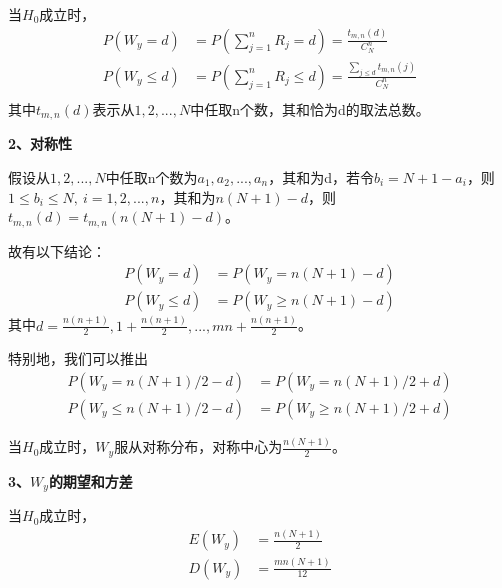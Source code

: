 \documentclass[lang=cn,10pt]{elegantbook}
\begin{document}
\begin{proposition}
    当$H_0$成立时，
    \begin{equation}
        \begin{aligned}
            P(W_y = d) &= P(\sum_{j=1}^{n}R_{j} = d) =  \frac{t_{m,n}(d)}{C_N^n}\\
            P(W_y \leq d) &= P(\sum_{j=1}^{n}R_{j} \leq d) =  \frac{\sum_{j\leq d}t_{m,n}(j)}{C_N^n}\\
        \end{aligned}
    \end{equation}
    其中$t_{m,n}(d)$表示从$1,2,...,N$中任取n个数，其和恰为d的取法总数。
\end{proposition}

\textbf{2、对称性}

假设从$1,2,...,N$中任取n个数为$a_1,a_2,...,a_n$，其和为d，若令$b_i = N+1-a_i$，则$1\leq b_i \leq N,~i = 1,2,...,n$，其和为$n(N+1)-d$，则$t_{m,n}(d) = t_{m,n}(n(N+1)-d)$。

故有以下结论：
\begin{equation}
    \begin{aligned}
        P(W_y=d)&=P(W_y=n(N+1)-d)\\
        P(W_y\leqslant d)&=P(W_y\geqslant n(N+1)-d)
    \end{aligned}
\end{equation}
其中$d = \frac{n(n+1)}{2},1+\frac{n(n+1)}{2},...,mn+\frac{n(n+1)}{2}$。

特别地，我们可以推出
\begin{equation}
    \begin{aligned}
        P(W_y=n(N+1)/2-d)&=P(W_y=n(N+1)/2+d)\\
        P(W_y\leqslant n(N+1)/2-d)&=P(W_y\geqslant n(N+1)/2+d)
    \end{aligned}
\end{equation}

\begin{proposition}
    当$H_0$成立时，$W_y$服从对称分布，对称中心为$\frac{n(N+1)}{2}$。
\end{proposition}

\textbf{3、$W_y$的期望和方差}
\begin{proposition}
    当$H_0$成立时，
    \begin{equation}
        \begin{aligned}
            E(W_y) &= \frac{n(N+1)}{2} \\
            D(W_y) &= \frac{mn(N+1)}{12}
        \end{aligned}
    \end{equation}
\end{proposition}
\end{document}
